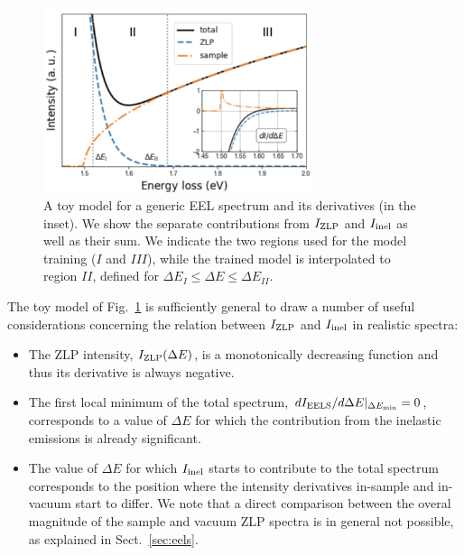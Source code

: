 \begin{figure}[t]
    \centering
    \includegraphics[width=0.7\textwidth]{plots/Toy.pdf}
    \caption{A toy model for a generic EEL spectrum and its
      derivatives (in the inset).
      We show the separate contributions from $I_{\rm ZLP}$
      and $I_{\rm inel}$ as well as their sum.
      We indicate the two regions used for the model training ($I$ and $III$),
      while the trained model is interpolated to region $II$, 
      defined for $\Delta E_I \le \Delta E \le \Delta E_{II}$.}
    \label{fig:EELS_toy}
\end{figure}

The toy model of Fig.~\ref{fig:EELS_toy} is sufficiently general to draw
a number of useful considerations concerning the relation between $I_{\rm ZLP}$ and $I_{\rm inel}$
in realistic spectra:

\begin{itemize}

\item The ZLP intensity, $I_{\rm ZLP}(\Delta E)$, is a monotonically decreasing function
  and thus its derivative is always negative.

\item  The first local minimum of the total spectrum, $dI_{\rm EELS}/d\Delta E|_{\Delta E_{\rm min}}=0$, corresponds
  to a value of $\Delta E$ for which the contribution from the inelastic emissions is already
  significant.

\item The value of $\Delta E$ for which $I_{\rm inel}$ starts to contribute to the total spectrum
  corresponds to the position where the intensity derivatives in-sample and in-vacuum  start to differ.
  We note that a direct comparison between the overal magnitude of the sample and vacuum ZLP
  spectra is in general not possible, as explained in Sect.~\ref{sec:eels}. 
\end{itemize}

